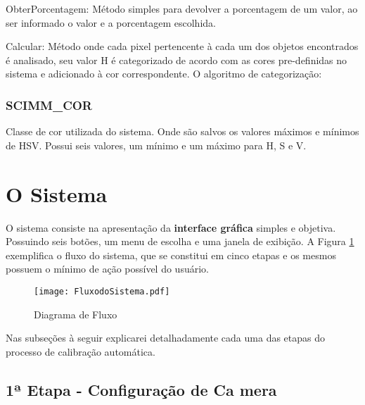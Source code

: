 \begin{description}
	\item ObterPorcentagem: Método simples para devolver a porcentagem de um valor, ao ser informado o valor e a porcentagem escolhida.
		
		\item Calcular: Método onde cada pixel pertencente à cada um dos objetos encontrados é analisado, seu valor H é categorizado de acordo com as cores pre-definidas no sistema e adicionado à cor correspondente.
		O algoritmo de categorização:
 
	
		\end{description}	

\subsubsection{SCIMM\_COR}
	Classe de cor utilizada do sistema. Onde são salvos os valores máximos e mínimos de HSV. Possui seis valores, um mínimo e um máximo para H, S e V. 


\section{O Sistema}

		 O sistema consiste na apresentação da \textbf{interface gráfica} simples e objetiva. Possuindo seis botões, um menu de escolha e uma janela de exibição.
		 A Figura \ref{FlowCHart} exemplifica o fluxo do sistema, que se constitui em cinco etapas e os mesmos possuem o mínimo de ação possível do usuário.
		
		\begin{figure}[H]
			\centering
			\texttt{[image: FluxodoSistema.pdf]}
			\caption{Diagrama de Fluxo}
			\label{FlowCHart}
		\end{figure}			
Nas subseções à seguir explicarei detalhadamente cada uma das etapas do processo de calibração automática.
		\subsection{1ª Etapa - Configuração de Ca mera}
		


